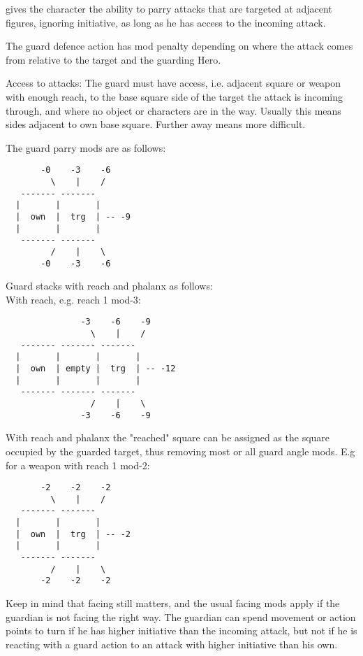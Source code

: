  gives the character the ability to parry attacks that are targeted at adjacent figures, ignoring initiative, as long as he has access to the incoming attack.

The guard defence action has mod penalty depending on where the attack comes from relative to the target and the guarding Hero.

Access to attacks: The guard must have access, i.e. adjacent square or weapon with enough reach, to the base square side of the target the attack is incoming through, and where no object or characters are in the way. Usually this means sides adjacent to own base square. Further away means more difficult.

The guard parry mods are as follows:
\begin{samepage} \small \begin{verbatim}
       -0    -3    -6
         \    |    /
   ------- -------
  |       |       |
  |  own  |  trg  | -- -9
  |       |       |
   ------- -------
         /    |    \
       -0    -3    -6
\end{verbatim} \normalsize \end{samepage}

Guard stacks with reach and phalanx as follows:\\
With reach, e.g. reach 1 mod-3:
\begin{samepage} \small \begin{verbatim}
               -3    -6    -9
                 \    |    /
   ------- ------- -------
  |       |       |       |
  |  own  | empty |  trg  | -- -12
  |       |       |       |
   ------- ------- -------
                 /    |    \
               -3    -6    -9
\end{verbatim} \normalsize \end{samepage}

With reach and phalanx the "reached" square can be assigned as the square occupied by the guarded target, thus removing most or all guard angle mods. E.g for a weapon with reach 1 mod-2:
\begin{samepage} \small \begin{verbatim}
       -2    -2    -2
         \    |    /
   ------- -------
  |       |       |
  |  own  |  trg  | -- -2
  |       |       |
   ------- -------
         /    |    \
       -2    -2    -2
\end{verbatim} \normalsize \end{samepage}

Keep in mind that facing still matters, and the usual facing mods apply if the guardian is not facing the right way. The guardian can spend movement or action points to turn if he has higher initiative than the incoming attack, but not if he is reacting with a guard action to an attack with higher initiative than his own.


